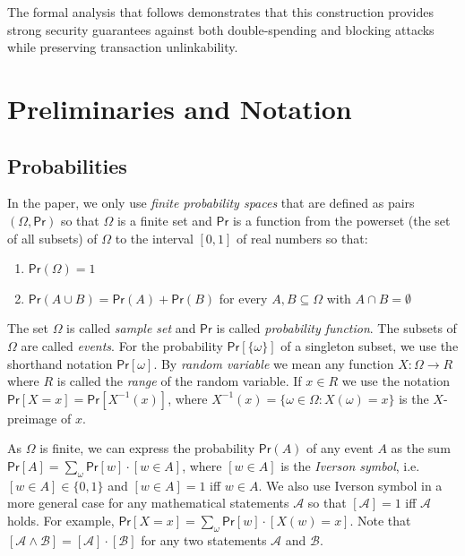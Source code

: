 \documentclass{article}
\newcommand{\prob}[0]{\mathsf{Pr}} %
\begin{document}
The formal analysis that follows demonstrates that this construction provides strong security guarantees against both double-spending and blocking attacks while preserving transaction unlinkability.


\section{Preliminaries and Notation}

\subsection{Probabilities}

In the paper, we only use \emph{finite probability spaces} that are defined as pairs $(\Omega, \prob)$ so that $\Omega$ is a finite set and $\prob$ is a function from the powerset (the set of all subsets) of $\Omega$ to the interval $[0,1]$ of real numbers so that:
\begin{enumerate}
\item $\prob(\Omega)=1$
\item $\prob(A\cup B)=\prob(A) + \prob(B)$ for every $A,B\subseteq \Omega$ with $A\cap B=\emptyset$
\end{enumerate}

\noindent The set $\Omega$ is called \emph{sample set} and $\prob$ is called \emph{probability function}. The subsets of $\Omega$ are called \emph{events}. For the probability $\prob[\{\omega\}]$ of a singleton subset, we use the shorthand notation $\prob[\omega]$.
By \emph{random variable} we mean any function $X\colon \Omega \rightarrow R$ where $R$ is called the \emph{range} of the random variable. If $x\in R$ we use the notation $\prob[X=x] = \prob[X^{-1}(x)]$, where $X^{-1}(x)=\{\omega\in\Omega\colon X(\omega)=x\}$ is the $X$-preimage of $x$.

As $\Omega$ is finite, we can express the probability $\prob(A)$ of any event $A$ as the sum $\prob[A]=\sum_\omega \prob[w]\cdot [w\in A]$, where
$[w\in A]$ is the \emph{Iverson symbol}, i.e. $[w\in A]\in\{0,1\}$ and $[w\in A]=1$ iff $w\in A$. We also use Iverson symbol in a more general case for any mathematical statements $\mathcal{A}$ so that $[\mathcal{A}]=1$ iff $\mathcal{A}$ holds. For example, $\prob[X=x]=\sum_\omega \prob[w]\cdot [X(w)=x]$. Note that $[\mathcal{A}\wedge \mathcal{B}]=[\mathcal{A}]\cdot[\mathcal{B}]$ for any two statements
$\mathcal{A}$ and $\mathcal{B}$.
\end{document}
